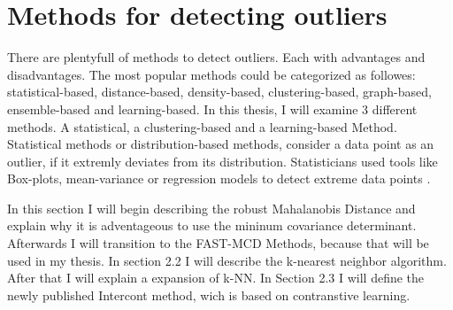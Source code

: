 \section{Methods for detecting outliers}
There are plentyfull of methods to detect outliers. Each with advantages and disadvantages.
The most popular methods could be categorized as followes: statistical-based, distance-based, density-based,  clustering-based,
graph-based, ensemble-based and learning-based.\citep{wang2019progress} 
In this thesis, I will examine 3 different methods. A statistical, a clustering-based and a learning-based Method.
Statistical methods or distribution-based methods, consider a data point as an outlier, if it extremly deviates from its distribution.
Statisticians used tools like Box-plots, mean-variance or regression models to detect extreme data points \citep[p.3]{smiti2020critical}.

In this section I will begin describing the robust Mahalanobis Distance and explain why it is adventageous to use the mininum covariance determinant.
Afterwards I will transition to the FAST-MCD Methods, because that will be used in my thesis.
In section 2.2 I will describe the k-nearest neighbor algorithm.
After that I will explain a expansion of k-NN.
In Section 2.3 I will define the newly published Intercont method, wich is based on contranstive learning.


